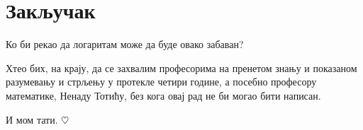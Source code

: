 \section{Закључак}

Ко би рекао да логаритам може да буде овако забаван?

\medskip

Хтео бих, на крају, да се захвалим професорима 
на пренетом знању и показаном разумевању и стрљењу у протекле четири године, 
а посебно професору математике, Ненаду Тотићу, 
без кога овај рад не би могао бити написан.

\medskip

И мом тати. {\color{red}$\heartsuit$}

\bigskip



\clearpage
